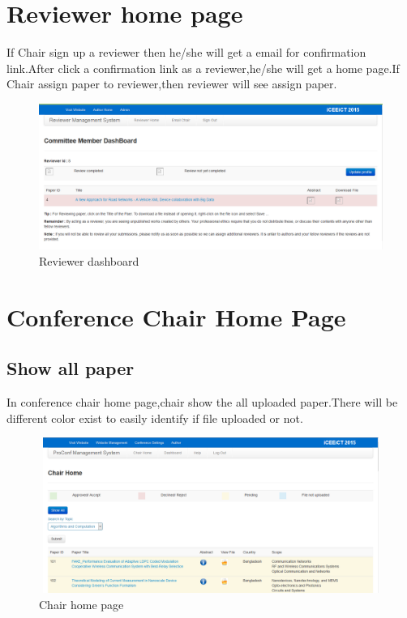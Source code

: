 \section{Reviewer home page}
If Chair sign up a reviewer then he/she will get a email for confirmation link.After click a confirmation link as a reviewer,he/she will get a home page.If Chair assign  paper to reviewer,then reviewer will see assign paper.
\begin{figure}[h!]
\centering
  \includegraphics[width=5in]{pic/review1}
   \caption{Reviewer dashboard }\label{review}
\end{figure}



\section{Conference Chair Home Page}
\subsection{Show all paper}
In conference chair home page,chair show the all uploaded paper.There will be different color exist to easily identify if file uploaded or not.

\begin{figure}[h!]
\centering
  \includegraphics[width=5in,height=2in]{pic/chairhome}
   \caption{Chair home page }\label{chairhome}
\end{figure}


